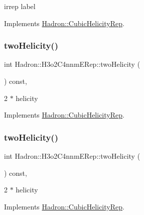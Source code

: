 irrep label 

Implements \mbox{\hyperlink{structHadron_1_1CubicHelicityRep_a8cdd86f068a167dc96faef02bfb8a33d}{Hadron\+::\+Cubic\+Helicity\+Rep}}.

\mbox{\label{structHadron_1_1H3o2C4nnmERep_a35fd1930d21f1fdc0c007b9d9f95b211}} 
\subsubsection{\texorpdfstring{twoHelicity()}{twoHelicity()}\hspace{0.1cm}{\footnotesize\ttfamily [1/3]}}
{\footnotesize\ttfamily int Hadron\+::\+H3o2\+C4nnm\+E\+Rep\+::two\+Helicity (\begin{DoxyParamCaption}{ }\end{DoxyParamCaption}) const\hspace{0.3cm}{\ttfamily [inline]}, {\ttfamily [virtual]}}

2 $\ast$ helicity 

Implements \mbox{\hyperlink{structHadron_1_1CubicHelicityRep_af507aa56fc2747eacc8cb6c96db31ecc}{Hadron\+::\+Cubic\+Helicity\+Rep}}.

\mbox{\label{structHadron_1_1H3o2C4nnmERep_a35fd1930d21f1fdc0c007b9d9f95b211}} 
\subsubsection{\texorpdfstring{twoHelicity()}{twoHelicity()}\hspace{0.1cm}{\footnotesize\ttfamily [2/3]}}
{\footnotesize\ttfamily int Hadron\+::\+H3o2\+C4nnm\+E\+Rep\+::two\+Helicity (\begin{DoxyParamCaption}{ }\end{DoxyParamCaption}) const\hspace{0.3cm}{\ttfamily [inline]}, {\ttfamily [virtual]}}

2 $\ast$ helicity 

Implements \mbox{\hyperlink{structHadron_1_1CubicHelicityRep_af507aa56fc2747eacc8cb6c96db31ecc}{Hadron\+::\+Cubic\+Helicity\+Rep}}.

